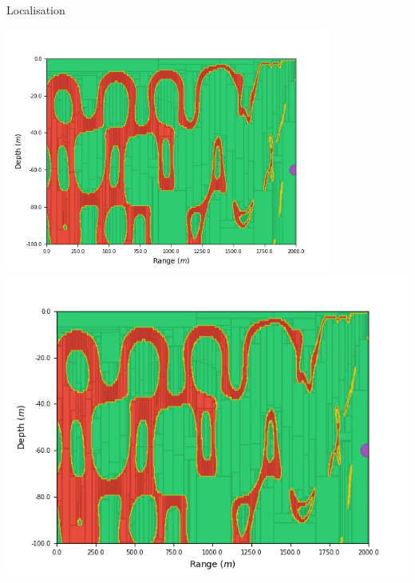 \documentclass[9pt, xcolor={usenames, dvipsnames}]{beamer}
\begin{document}
\begin{frame}{Localisation}
\begin{minipage}[t][0.1\textheight][t]{\textwidth}
\begin{minipage}[t][\textheight][t]{0.325\textwidth}
\begin{overprint}
							\end{overprint}
						\end{minipage}
						\hfill
						\begin{minipage}[t][\textheight][t]{0.325\textwidth}
							\begin{overprint}
								\centering\includegraphics[width=0.8\textwidth]{images/localisation/Hydrophone_60_2000.png}
								\onslide<3-3>\centering\includegraphics[width=\textwidth]{images/localisation/Hydrophone_60_2000.png}
							\end{overprint}
						\end{minipage}
					\end{minipage}
					\vspace{0.5cm}
					\begin{minipage}[t][0.7\textheight][t]{0.48\textwidth}
						\begin{overprint}

\end{overprint}
\end{minipage}
\end{frame}
\end{document}
